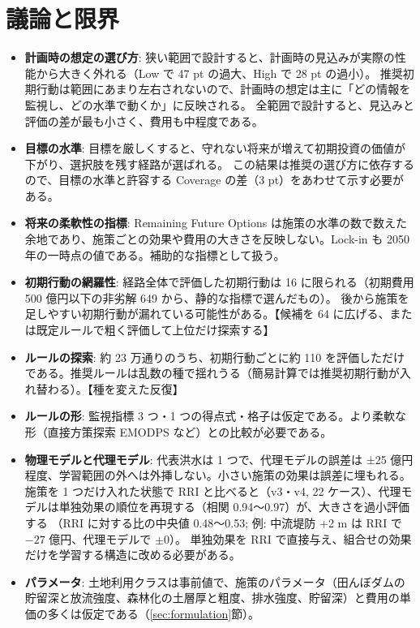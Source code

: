 \documentclass[a4paper,10pt]{ltjsarticle}
\newcommand{\todo}[1]{\textcolor{corange}{【#1】}}
\begin{document}
\section{議論と限界}
\label{sec:discussion}
\begin{itemize}
  \item \textbf{計画時の想定の選び方}: 狭い範囲で設計すると、計画時の見込みが実際の性能から大きく外れる（Low で 47 pt の過大、High で 28 pt の過小）。
    推奨初期行動は範囲にあまり左右されないので、計画時の想定は主に「どの情報を監視し、どの水準で動くか」に反映される。
    全範囲で設計すると、見込みと評価の差が最も小さく、費用も中程度である。
  \item \textbf{目標の水準}: 目標を厳しくすると、守れない将来が増えて初期投資の価値が下がり、選択肢を残す経路が選ばれる。
    この結果は推奨の選び方に依存するので、目標の水準と許容する Coverage の差（3 pt）をあわせて示す必要がある。
  \item \textbf{将来の柔軟性の指標}: Remaining Future Options は施策の水準の数で数えた余地であり、施策ごとの効果や費用の大きさを反映しない。Lock-in も 2050 年の一時点の値である。補助的な指標として扱う。
  \item \textbf{初期行動の網羅性}: 経路全体で評価した初期行動は 16 に限られる（初期費用 500 億円以下の非劣解 649 から、静的な指標で選んだもの）。
    後から施策を足しやすい初期行動が漏れている可能性がある。\todo{候補を 64 に広げる、または既定ルールで粗く評価して上位だけ探索する}
  \item \textbf{ルールの探索}: 約 23 万通りのうち、初期行動ごとに約 110 を評価しただけである。推奨ルールは乱数の種で揺れうる（簡易計算では推奨初期行動が入れ替わる）。\todo{種を変えた反復}
  \item \textbf{ルールの形}: 監視指標 3 つ・1 つの得点式・格子は仮定である。より柔軟な形（直接方策探索 EMODPS\cite{giuliani2016,quinn2017} など）との比較が必要である。
  \item \textbf{物理モデルと代理モデル}: 代表洪水は 1 つで、代理モデルの誤差は ±25 億円程度、学習範囲の外へは外挿しない。小さい施策の効果は誤差に埋もれる。
    施策を 1 つだけ入れた状態で RRI と比べると（v3・v4, 22 ケース）、代理モデルは単独効果の順位を再現する（相関 0.94〜0.97）が、大きさを過小評価する
    （RRI に対する比の中央値 0.48〜0.53; 例: 中流堤防 +2 m は RRI で $-27$ 億円、代理モデルで $\pm0$）。
    単独効果を RRI で直接与え、組合せの効果だけを学習する構造に改める必要がある。
  \item \textbf{パラメータ}: 土地利用クラスは事前値で、施策のパラメータ（田んぼダムの貯留深と放流強度、森林化の土層厚と粗度、排水強度、貯留深）と費用の単価の多くは仮定である（\ref{sec:formulation}節）。

\end{itemize}
\end{document}
